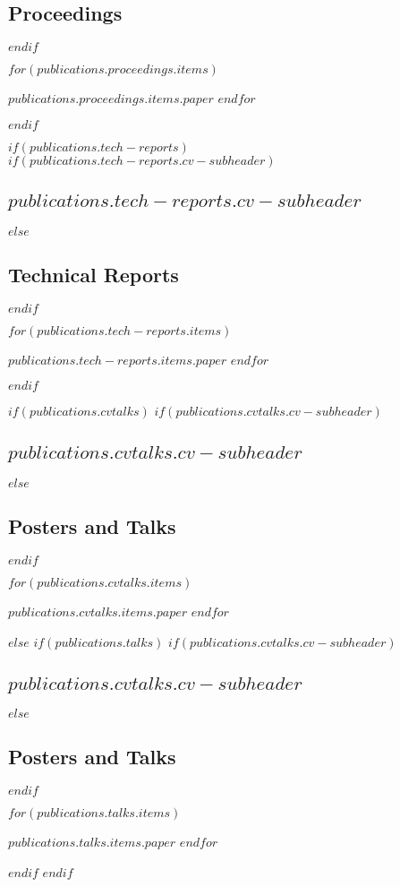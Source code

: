 \documentclass[letterpaper,10pt,final]{moderncv}
\begin{document}
\subsection{Proceedings}
$endif$
\vspace*{0.25em}
\begin{list}{}{\leftmargin=1em \itemindent=-1em \itemsep=0.25em}
$for(publications.proceedings.items)$
\item $publications.proceedings.items.paper$
$endfor$
\end{list}
$endif$

$if(publications.tech-reports)$
$if(publications.tech-reports.cv-subheader)$
\subsection{$publications.tech-reports.cv-subheader$}
$else$
\subsection{Technical Reports}
$endif$
\vspace*{0.25em}
\begin{list}{}{\leftmargin=1em \itemindent=-1em \itemsep=0.25em}
$for(publications.tech-reports.items)$
\item $publications.tech-reports.items.paper$
$endfor$
\end{list}
$endif$

$if(publications.cvtalks)$
$if(publications.cvtalks.cv-subheader)$
\subsection{$publications.cvtalks.cv-subheader$}
$else$
\subsection{Posters and Talks}
$endif$
\vspace*{0.25em}
\begin{list}{}{\leftmargin=1em \itemindent=-1em \itemsep=0.25em}
$for(publications.cvtalks.items)$
\item $publications.cvtalks.items.paper$
$endfor$
\end{list}
$else$
$if(publications.talks)$
$if(publications.cvtalks.cv-subheader)$
\subsection{$publications.cvtalks.cv-subheader$}
$else$
\subsection{Posters and Talks}
$endif$
\vspace*{0.25em}
\begin{list}{}{\leftmargin=1em \itemindent=-1em \itemsep=0.25em}
$for(publications.talks.items)$
\item $publications.talks.items.paper$
$endfor$
\end{list}
$endif$
$endif$
\end{document}
